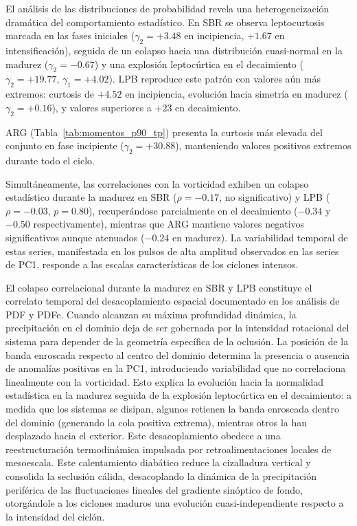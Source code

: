El análisis de las distribuciones de probabilidad revela una heterogeneización dramática del comportamiento estadístico. 
En SBR se observa leptocurtosis marcada en las fases iniciales ($\gamma_2 = +3.48$ en incipiencia, $+1.67$ en intensificación), seguida de un colapso hacia una distribución cuasi-normal en la madurez ($\gamma_2 = -0.67$) y una explosión leptocúrtica en el decaimiento ($\gamma_2 = +19.77$, $\gamma_1 = +4.02$). 
LPB reproduce este patrón con valores aún más extremos: curtosis de $+4.52$ en incipiencia, evolución hacia simetría en madurez ($\gamma_2 = +0.16$), y valores superiores a $+23$ en decaimiento. 

ARG (Tabla~\ref{tab:momentos_p90_tp}) presenta la curtosis más elevada del conjunto en fase incipiente ($\gamma_2 = +30.88$), manteniendo valores positivos extremos durante todo el ciclo. 

Simultáneamente, las correlaciones con la vorticidad exhiben un colapso estadístico durante la madurez en SBR ($\rho = -0.17$, no significativo) y LPB ($\rho = -0.03$, $p = 0.80$), recuperándose parcialmente en el decaimiento ($-0.34$ y $-0.50$ respectivamente), mientras que ARG mantiene valores negativos significativos aunque atenuados ($-0.24$ en madurez).
La variabilidad temporal de estas series, manifestada en los pulsos de alta amplitud observados en las series de PC1, responde a las escalas características de los ciclones intensos. 

El colapso correlacional durante la madurez en SBR y LPB constituye el correlato temporal del desacoplamiento espacial documentado en los análisis de PDF y PDFe. 
Cuando  alcanzan su máxima profundidad dinámica, la precipitación en el dominio deja de ser gobernada por la intensidad rotacional del sistema para depender de la geometría específica de la oclusión. 
La posición de la banda enroscada respecto al centro del dominio determina la presencia o ausencia de anomalías positivas en la PC1, introduciendo variabilidad que no correlaciona linealmente con la vorticidad. 
Esto explica la evolución hacia la normalidad estadística en la madurez seguida de la explosión leptocúrtica en el decaimiento: a medida que los sistemas se disipan, algunos retienen la banda enroscada dentro del dominio (generando la cola positiva extrema), mientras otros la han desplazado hacia el exterior.
Este desacoplamiento obedece a una reestructuración termodinámica impulsada por retroalimentaciones locales de mesoescala. 
Este calentamiento diabático reduce la cizalladura vertical y consolida la seclusión cálida, desacoplando la dinámica de la precipitación periférica de las fluctuaciones lineales del gradiente sinóptico de fondo, otorgándole a los ciclones maduros una evolución cuasi-independiente respecto a la intensidad del ciclón.

